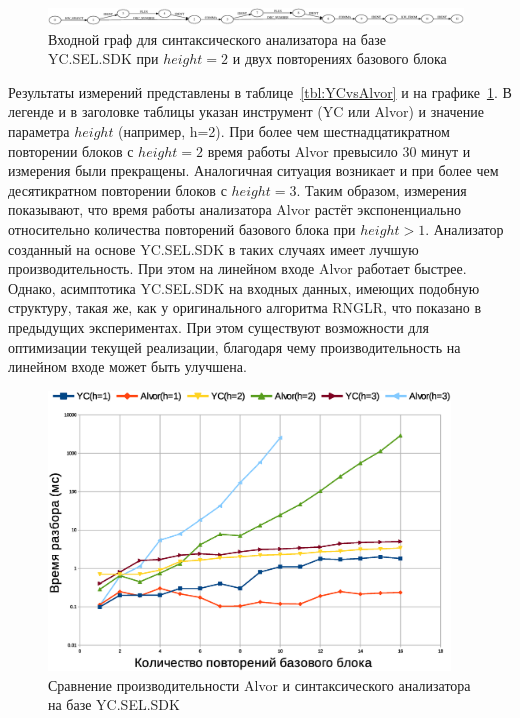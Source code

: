 \begin{figure}[h!]
 \centering
 \includegraphics[width=0.98\textwidth]{pics/ycSQLinput.eps}
 \caption{Входной граф для синтаксического анализатора на базе YC.SEL.SDK при $height=2$ и двух повторениях базового блока}
 \label{fig:YCInput}
\end{figure}

Результаты измерений представлены в таблице~\ref{tbl:YCvsAlvor} и на графике~\ref{fig:YCInput}. В легенде и в заголовке таблицы указан инструмент (YC или Alvor) и значение параметра $height$ (например, h=2). При более чем шестнадцатикратном повторении блоков с $height=2$ время работы Alvor превысило 30 минут и измерения были прекращены. Аналогичная ситуация возникает и при более чем десятикратном повторении блоков с $height=3$. Таким образом, измерения показывают, что время работы анализатора Alvor растёт экспоненциально относительно количества повторений базового блока при $height>1$. Анализатор созданный на основе YC.SEL.SDK в таких случаях имеет лучшую производительность. При этом на линейном входе Alvor работает быстрее. Однако, асимптотика YC.SEL.SDK на входных данных, имеющих подобную структуру, такая же, как у оригинального алгоритма RNGLR, что показано в предыдущих экспериментах. При этом существуют возможности для оптимизации текущей реализации, благодаря чему производительность на линейном входе может быть улучшена.

\begin{figure}[h!]
 \centering
 \includegraphics[width=0.95\textwidth]{pics/AlvorVsYC.eps}
 \caption{Сравнение производительности Alvor и синтаксического анализатора на базе YC.SEL.SDK}
 \label{fig:YCvsAlvor}
\end{figure}


